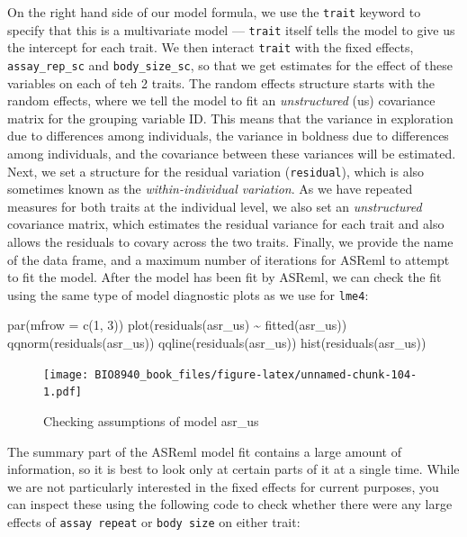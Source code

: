 \documentclass[
  12pt,
]{book}
\newenvironment{Shaded}{\begin{snugshade}}{\end{snugshade}}
\newcommand{\AttributeTok}[1]{\textcolor[rgb]{0.77,0.63,0.00}{#1}}
\newcommand{\DecValTok}[1]{\textcolor[rgb]{0.00,0.00,0.81}{#1}}
\newcommand{\FunctionTok}[1]{\textcolor[rgb]{0.00,0.00,0.00}{#1}}
\newcommand{\NormalTok}[1]{#1}
\newcommand{\SpecialCharTok}[1]{\textcolor[rgb]{0.00,0.00,0.00}{#1}}
\begin{document}
On the right hand side of our model formula, we use the \texttt{trait} keyword to specify that this is a multivariate model --- \texttt{trait} itself tells the model to give us the intercept for each trait. We then interact \texttt{trait} with the fixed effects, \texttt{assay\_rep\_sc} and \texttt{body\_size\_sc}, so that we get estimates for the effect of these variables on each of teh 2 traits.
The random effects structure starts with the random effects, where we tell the model to fit an \emph{unstructured} (us) covariance matrix for the grouping variable ID. This means that the variance in exploration due to differences among individuals, the variance in boldness due to differences among individuals, and the covariance between these variances will be estimated.
Next, we set a structure for the residual variation (\texttt{residual}), which is also sometimes known as the \emph{within-individual variation}. As we have repeated measures for both traits at the individual level, we also set an \emph{unstructured} covariance matrix, which estimates the residual variance for each trait and also allows the residuals
to covary across the two traits.
Finally, we provide the name of the data frame, and a maximum number of iterations for ASReml to attempt to fit the model.
After the model has been fit by ASReml, we can check the fit using the same type of model diagnostic plots as we use for \texttt{lme4}:

\begin{Shaded}
\begin{Highlighting}[]
\FunctionTok{par}\NormalTok{(}\AttributeTok{mfrow =} \FunctionTok{c}\NormalTok{(}\DecValTok{1}\NormalTok{, }\DecValTok{3}\NormalTok{))}
\FunctionTok{plot}\NormalTok{(}\FunctionTok{residuals}\NormalTok{(asr\_us) }\SpecialCharTok{\textasciitilde{}} \FunctionTok{fitted}\NormalTok{(asr\_us))}
\FunctionTok{qqnorm}\NormalTok{(}\FunctionTok{residuals}\NormalTok{(asr\_us))}
\FunctionTok{qqline}\NormalTok{(}\FunctionTok{residuals}\NormalTok{(asr\_us))}
\FunctionTok{hist}\NormalTok{(}\FunctionTok{residuals}\NormalTok{(asr\_us))}
\end{Highlighting}
\end{Shaded}

\begin{figure}
\centering
\texttt{[image: BIO8940\_book\_files/figure-latex/unnamed-chunk-104-1.pdf]}
\caption{\label{fig:unnamed-chunk-104}Checking assumptions of model asr\_us}
\end{figure}

The summary part of the ASReml model fit contains a large amount of information, so it is best to look only at certain parts of it at a single time. While we are not particularly interested in the fixed effects for current purposes, you can inspect these using the following code to check whether there were any large effects of \texttt{assay\ repeat} or \texttt{body\ size} on either trait:
\end{document}
